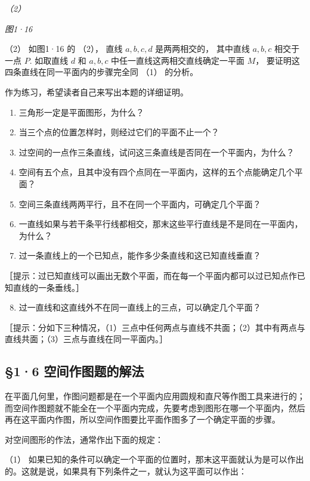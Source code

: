 \emph{（2）}

\emph{图1·16}

（2） 如图1·16 的 （2）， 直线 \(a, b, c, d\) 是两两相交的， 其中直线
\(a, b, c\) 相交于一点 \(P\). 如取直线 \(d\) 和 \(a, b, c\)
中任一直线这两相交直线确定一平面 \(M\)，
要证明这四条直线在同一平面内的步骤完全同 （1） 的分析。

作为练习，希望读者自己来写出本题的详细证明。

\begin{enumerate}
\item
  三角形一定是平面图形，为什么？
\item
  当三个点的位置怎样时，则经过它们的平面不止一个？
\item
  过空间的一点作三条直线，试问这三条直线是否同在一个平面内，为什么？
\item
  空间有五个点，且其中没有四个点同在一平面内，这样的五个点能确定几个平面？
\item
  空间三条直线两两平行，且不在同一个平面内，可确定几个平面？
\item
  一直线如果与若干条平行线都相交，那末这些平行直线是不是同在一平面内，为什么？
\item
  过一条直线上的一个已知点，能作多少条直线和这已知直线垂直？
\end{enumerate}

［提示：过已知直线可以画出无数个平面，而在每一个平面内都可以过已知点作已知直线的一条垂线。］

\begin{enumerate}
\setcounter{enumi}{7}
\item
  过一直线和这直线外不在同一直线上的三点，可以确定几个平面？
\end{enumerate}

［提示：分如下三种情况，（1）三点中任何两点与直线不共面；（2）其中有两点与直线共面；（3）三点与直线在同一平面内。］

\subsection{§1·6
空间作图题的解法}

在平面几何里，作图问题都是在一个平面内应用圆规和直尺等作图工具来进行的；而空间作图题就不能全在一个平面内完成，先要考虑到图形在哪一个平面内，然后再在这平面内作图，所以空间作图要比平面作图多了一个确定平面的步骤。

对空间图形的作法，通常作出下面的规定：

（1）
如果已知的条件可以确定一个平面的位置时，那末这平面就认为是可以作出的。这就是说，如果具有下列条件之一，就认为这平面可以作出：

